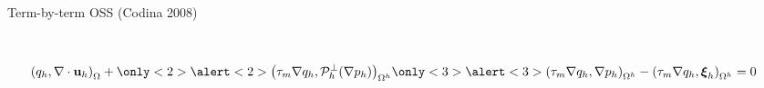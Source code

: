 \begin{frame}[t]
{\begin{block}{Term-by-term OSS (Codina 2008)}
\begin{overlayarea}{\textwidth}{6.0cm}
\begin{align*}
\\[0.1in]
%
&\left( q_{h},\mathbf{\nabla }\cdot \mathbf{u}_{h}\right) _{\Omega }
+\only<2>{\alert<2>{\left(\tau_m \nabla q_{h},\mathcal{P}_h^\perp(\nabla p_{h})\right) _{\Omega^h}} }
\only<3>{\alert<3>{\left(\tau_m \nabla q_{h},\nabla p_{h}\right) _{\Omega^h}-\left(\tau_m \nabla q_{h},\boldsymbol{\xi}_{h}\right) _{\Omega^h}}}
 =0
\end{align*}
\end{overlayarea}
\end{block}}
\end{frame}
